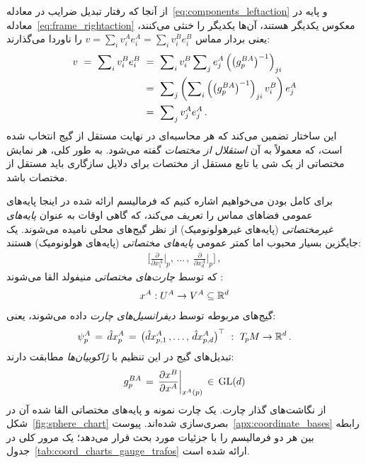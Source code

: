 از آنجا که رفتار تبدیل ضرایب در معادله~\eqref{eq:components_leftaction} و پایه در معادله~\eqref{eq:frame_rightaction} معکوس یکدیگر هستند، آن‌ها یکدیگر را خنثی می‌کنند، یعنی بردار مماس $v = \sum_i v_i^A e_{i}^A = \sum_i v_i^B e_{i}^B$ را ناوردا می‌گذارند:
\begin{align}\label{eq:vector_in_different_bases}
	v\ =\ \sum\nolimits_i v_i^B e_{i}^B
	\ &=\ \sum\nolimits_i v_i^B \sum\nolimits_j e_{j}^A \left(\left(g_p^{BA}\right)^{-1}\right)_{ji} \notag\\
	\ &=\ \sum\nolimits_j \left(\sum\nolimits_i \left(\left(g_p^{BA}\right)^{-1}\right)_{ji} v_i^B\right) e_{j}^A \notag\\
	\ &=\ \sum\nolimits_j v_j^A e_{j}^A \,.
\end{align}
این ساختار تضمین می‌کند که هر محاسبه‌ای در نهایت مستقل از گیج انتخاب شده است، که معمولاً به آن \emph{استقلال از مختصات} گفته می‌شود. به طور کلی، هر نمایش مختصاتی از یک شی یا تابع مستقل از مختصات برای دلایل سازگاری باید مستقل از مختصات باشد.


برای کامل بودن می‌خواهیم اشاره کنیم که فرمالیسم ارائه شده در اینجا پایه‌های عمومی فضاهای مماس را تعریف می‌کند، که گاهی اوقات به عنوان \emph{پایه‌های غیرمختصاتی} (پایه‌های غیرهولونومیک) از نظر گیج‌های محلی نامیده می‌شوند.
یک جایگزین بسیار محبوب اما کمتر عمومی \emph{پایه‌های مختصاتی} (پایه‌های هولونومیک) هستند:
\begin{align}
	\bigg[\frac{\partial}{\partial x^A_1} \bigg|_p ,\,\dots\,,\ \frac{\partial}{\partial x^A_d} \bigg|_p \bigg] \,,
\end{align}
که توسط \emph{چارت‌های مختصاتی} منیفولد القا می‌شوند \cite{nakahara2003geometry}:
\begin{align}\label{eq:chart_21}
	x^A: U^A \to V^A \subseteq \mathbb{R}^d
\end{align}
گیج‌های مربوطه توسط \emph{دیفرانسیل‌های چارت} داده می‌شوند، یعنی:
\begin{align}
	\psi_p^A \,=\, \hat{d}x^A_p \,=\, \big( \hat{d}x^A_{p,1} \,,\dots,\, \hat{d}x^A_{p,d} \big)^\top\ :\ T_{\mkern-1.5mu p}\mkern-.5muM \to \mathbb{R}^d \,.
\end{align}
تبدیل‌های گیج در این تنظیم با \emph{ژاکوبیان‌ها} مطابقت دارند:
\begin{align}
	g_p^{BA} \,=\, \frac{\partial x^B}{\partial x^A} \bigg|_{x^A(p)} \,\in\, \operatorname{GL}(d)
\end{align}
از نگاشت‌های گذار چارت.
یک چارت نمونه و پایه‌های مختصاتی القا شده آن در شکل~\ref{fig:sphere_chart} بصری‌سازی شده‌اند.
پیوست~\ref{apx:coordinate_bases} رابطه بین هر دو فرمالیسم را با جزئیات مورد بحث قرار می‌دهد؛ یک مرور کلی در جدول~\ref{tab:coord_charts_gauge_trafos} ارائه شده است.



